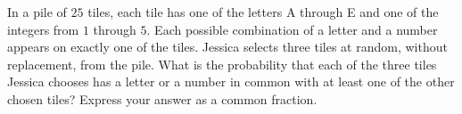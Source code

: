 In a pile of $25$ tiles, each tile has one of the letters A through E and one of the integers from $1$ through $5$. Each possible combination of a letter and a number appears on exactly one of the tiles. Jessica selects three tiles at random, without replacement, from the pile. What is the probability that each of the three tiles Jessica chooses has a letter or a number in common with at least one of the other chosen tiles? Express your answer as a common fraction.
